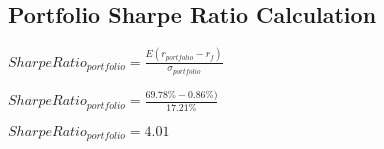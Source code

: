 \documentclass{article}
\begin{document}
\subsection{Portfolio Sharpe Ratio Calculation}
\begin{center}
    \begin{math}
        Sharpe Ratio_{portfolio} = \frac{E(r_{portfolio}-r_f)}{\sigma_{portfolio}}
\end{math}
\end{center}

\begin{center}
\begin{math}
        Sharpe Ratio_{portfolio} = \frac{69.78\%-0.86\%)}{17.21\%}
\end{math}
\end{center}

\begin{center}
\begin{math}
        Sharpe Ratio_{portfolio} = 4.01
\end{math}
\end{center}
\end{document}
